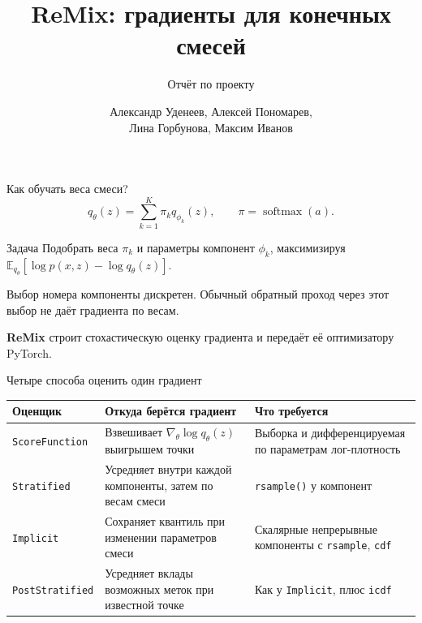 \documentclass[aspectratio=169]{beamer}
\title{ReMix: градиенты для конечных смесей}
\subtitle{Отчёт по проекту}
\author{Александр Уденеев, Алексей Пономарев,\\ Лина Горбунова, Максим Иванов}
\institute{ИАД, МФТИ}
\date{}
\begin{document}
\begin{frame}
\thispagestyle{empty}
\maketitle
\end{frame}

\begin{frame}{Как обучать веса смеси?}
\[
 q_\theta(z)=\sum_{k=1}^K \pi_k q_{\phi_k}(z),
 \qquad \pi=\operatorname{softmax}(a).
\]
\begin{block}{Задача}
Подобрать веса $\pi_k$ и параметры компонент $\phi_k$, максимизируя
$\mathbb E_{q_\theta}[\log p(x,z)-\log q_\theta(z)]$.
\end{block}
Выбор номера компоненты дискретен. Обычный обратный проход через этот выбор не даёт градиента по весам.
\medskip

\textbf{ReMix} строит стохастическую оценку градиента и передаёт её оптимизатору PyTorch.
\end{frame}

\begin{frame}{Четыре способа оценить один градиент}
\small
\renewcommand{\arraystretch}{1.4}
\begin{tabular}{@{}p{.21\linewidth}p{.41\linewidth}p{.31\linewidth}@{}}
\toprule
Оценщик & Откуда берётся градиент & Что требуется \\
\midrule
\texttt{ScoreFunction} & Взвешивает $\nabla_\theta\log q_\theta(z)$ выигрышем точки & Выборка и дифференцируемая по параметрам лог-плотность \\
\texttt{Stratified} & Усредняет внутри каждой компоненты, затем по весам смеси & \texttt{rsample()} у компонент \\
\texttt{Implicit} & Сохраняет квантиль при изменении параметров смеси & Скалярные непрерывные компоненты с \texttt{rsample}, \texttt{cdf} \\
\texttt{PostStratified} & Усредняет вклады возможных меток при известной точке & Как у \texttt{Implicit}, плюс \texttt{icdf} \\
\bottomrule
\end{tabular}
\end{frame}
\end{document}
